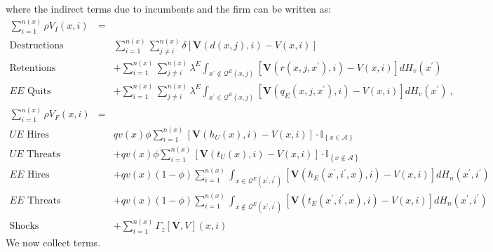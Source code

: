 where the indirect terms due to incumbents and the firm can be written as:
\begin{eqnarray*}
\sum\limits_{i=1}^{n\left( x\right) }\rho V_{I}(x,i) &=& \\
\text{Destructions} &&\sum\limits_{i=1}^{n\left( x\right) }\sum_{j\neq
i}^{n\left( x\right) }\delta \left[ \boldsymbol{V}\left( d(x,j),i\right)
-V\left( x,i\right) \right] \\
\text{Retentions} &&+\sum\limits_{i=1}^{n\left( x\right) }\sum_{j\neq
i}^{n\left( x\right) }\lambda ^{E}\int_{x^{\prime }\notin \mathcal{Q}%
^{E}\left( x,j\right) }\left[ \boldsymbol{V}\left( r\left( x,j,x^{\prime
}\right) ,i\right) -V\left( x,i\right) \right] dH_v\left( x^{\prime }\right) \\
\text{$EE$ Quits} &&+\sum\limits_{i=1}^{n\left( x\right) }\sum_{j\neq
i}^{n\left( x\right) }\lambda ^{E}\int_{x^{\prime }\in \mathcal{Q}^{E}\left(
x,j\right) }\left[ \boldsymbol{V}\left( q_{E}\left( x,j,x^{\prime }\right)
,i\right) -V\left( x,i\right) \right] dH_v\left( x^{\prime }\right) \ , \\
\sum\limits_{i=1}^{n\left( x\right) }\rho V_{F}(x,i) &=& \\
\text{$UE$ Hires} &&qv\left( x\right) \phi \sum\limits_{i=1}^{n\left(
x\right) }\left[ \boldsymbol{V}\left( h_{U}\left( x\right) ,i\right) -V\left(
x,i\right) \right] \cdot \mathbb{I}_{\left\{ x\in \mathcal{A}\right\} } \\
\text{$UE$ Threats} &&+qv\left( x\right) \phi \sum\limits_{i=1}^{n\left(
x\right) }\left[ \boldsymbol{V}\left( t_{U}\left( x\right) ,i\right) -V\left(
x,i\right) \right] \cdot \mathbb{I}_{\left\{ x\notin \mathcal{A}\right\} } \\
\text{$EE$ Hires} &&+qv\left( x\right) \left( 1-\phi \right)
\sum\limits_{i=1}^{n\left( x\right) }\int_{x\in \mathcal{Q}^{E}\left(
x^{\prime },i^{\prime }\right) }\left[ \boldsymbol{V}\left( h_{E}\left(
x^{\prime },i^{\prime },x\right) ,i\right) -V\left( x,i\right) \right]
dH_n\left( x^{\prime },i^{\prime }\right) \\
\text{$EE$ Threats} &&+qv\left( x\right) \left( 1-\phi \right)
\sum\limits_{i=1}^{n\left( x\right) }\int_{x\notin \mathcal{Q}^{E}\left(
x^{\prime },i^{\prime }\right) }\left[ \boldsymbol{V}\left( t_{E}\left(
x^{\prime },i^{\prime },x\right) ,i\right) -V\left( x,i\right) \right]
dH_n\left( x^{\prime },i^{\prime }\right) \\
\text{Shocks} &&+\sum\limits_{i=1}^{n\left( x\right) } \Gamma_z[\boldsymbol{V}%
,V](x,i)
\end{eqnarray*}%
We now collect terms.

